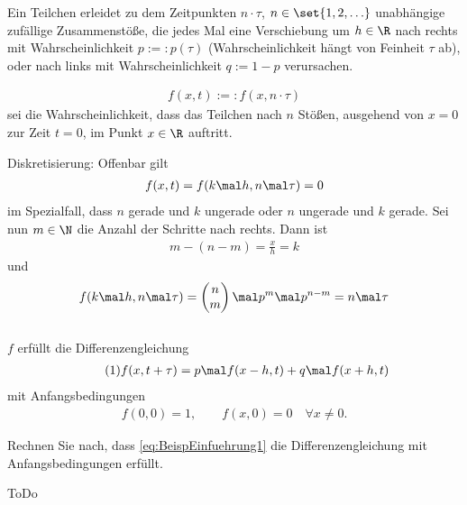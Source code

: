 \begin{beisp}\enter
	Ein Teilchen erleidet zu dem Zeitpunkten $n\cdot\tau$, $n\in\set{1,2,\ldots}$ unabhängige zufällige Zusammenstöße, 
	die jedes Mal eine Verschiebung um $h\in\R$ nach rechts mit Wahrscheinlichkeit $p:=:p(\tau)$ (Wahrscheinlichkeit hängt von Feinheit $\tau$ ab), 
	oder nach links mit Wahrscheinlichkeit $q:=1-p$ verursachen.
	
	\begin{notation}
		\begin{align*}
			f(x,t):=:f(x,n\cdot\tau)
		\end{align*}
		sei die Wahrscheinlichkeit, dass das Teilchen nach $n$ Stößen, ausgehend von $x=0$ zur Zeit $t=0$, im Punkt $x\in\R$ auftritt.
	\end{notation}
	Diskretisierung: Offenbar gilt
	\begin{align*}
		f(x,t)=f(k\mal h,n\mal\tau)=0
	\end{align*}
	im Spezialfall, dass  $n$ gerade und $k$ ungerade oder $n$ ungerade und $k$ gerade.
	Sei nun $m\in\N$ die Anzahl der Schritte nach rechts.
	Dann ist
	\begin{align*}
		m-(n-m)=\frac{x}{h}=k
	\end{align*}
	und 
	\begin{align*}
		f(k\mal h,n\mal\tau)=
		\begin{pmatrix}
			n\\
			m
		\end{pmatrix}
		\mal p^m\mal p^{n-m}
		=n\mal\tau
	\end{align*}
	\\
	$f$ erfüllt die Differenzengleichung
	\begin{align}\label{eq:BeispEinfuehrung1}\tag{1}
		f(x,t+\tau)=p\mal f(x-h,t)+q\mal f(x+h,t)
	\end{align}	 
	mit Anfangsbedingungen
	\begin{align*}
		f(0,0)=1,\qquad
		f(x,0)=0\quad
		\forall x\neq0.
	\end{align*}
	\begin{aufgabe}[1.2 Teil 1]\enter
		Rechnen Sie nach, dass \eqref{eq:BeispEinfuehrung1} die Differenzengleichung mit Anfangsbedingungen erfüllt.
	\end{aufgabe}
	\begin{lösung}
		ToDo %
	\end{lösung}

\end{beisp}
